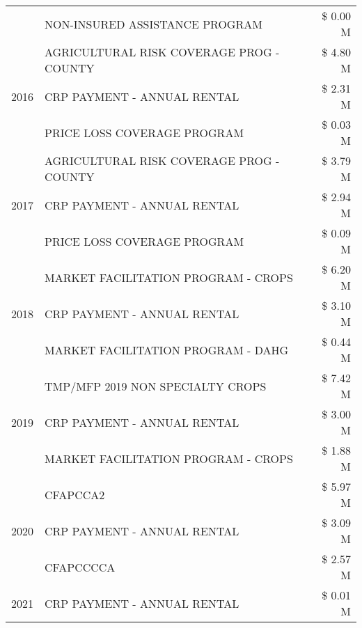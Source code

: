 \begin{tabular}{llr}
 & NON-INSURED ASSISTANCE PROGRAM & \$ 0.00 M \\
\cline{1-3}
\multirow[t]{3}{*}{2016} & AGRICULTURAL RISK COVERAGE PROG - COUNTY      & \$ 4.80 M \\
 & CRP PAYMENT - ANNUAL RENTAL                   & \$ 2.31 M \\
 & PRICE LOSS COVERAGE PROGRAM                   & \$ 0.03 M \\
\cline{1-3}
\multirow[t]{3}{*}{2017} & AGRICULTURAL RISK COVERAGE PROG - COUNTY & \$ 3.79 M \\
 & CRP PAYMENT - ANNUAL RENTAL & \$ 2.94 M \\
 & PRICE LOSS COVERAGE PROGRAM & \$ 0.09 M \\
\cline{1-3}
\multirow[t]{3}{*}{2018} & MARKET FACILITATION PROGRAM - CROPS & \$ 6.20 M \\
 & CRP PAYMENT - ANNUAL RENTAL & \$ 3.10 M \\
 & MARKET FACILITATION PROGRAM - DAHG & \$ 0.44 M \\
\cline{1-3}
\multirow[t]{3}{*}{2019} & TMP/MFP 2019 NON SPECIALTY CROPS & \$ 7.42 M \\
 & CRP PAYMENT - ANNUAL RENTAL & \$ 3.00 M \\
 & MARKET FACILITATION PROGRAM - CROPS & \$ 1.88 M \\
\cline{1-3}
\multirow[t]{3}{*}{2020} & CFAPCCA2 & \$ 5.97 M \\
 & CRP PAYMENT - ANNUAL RENTAL & \$ 3.09 M \\
 & CFAPCCCCA & \$ 2.57 M \\
\cline{1-3}
2021 & CRP PAYMENT - ANNUAL RENTAL & \$ 0.01 M \\
\cline{1-3}
\bottomrule
\end{tabular}
